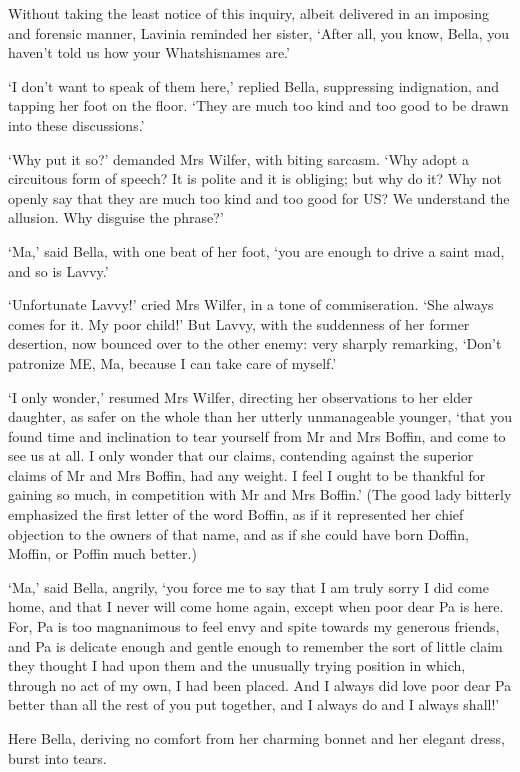 Without taking the least notice of this inquiry, albeit delivered in an
imposing and forensic manner, Lavinia reminded her sister, ‘After all,
you know, Bella, you haven’t told us how your Whatshisnames are.’

‘I don’t want to speak of them here,’ replied Bella, suppressing
indignation, and tapping her foot on the floor. ‘They are much too kind
and too good to be drawn into these discussions.’

‘Why put it so?’ demanded Mrs Wilfer, with biting sarcasm. ‘Why adopt a
circuitous form of speech? It is polite and it is obliging; but why do
it? Why not openly say that they are much too kind and too good for US?
We understand the allusion. Why disguise the phrase?’

‘Ma,’ said Bella, with one beat of her foot, ‘you are enough to drive a
saint mad, and so is Lavvy.’

‘Unfortunate Lavvy!’ cried Mrs Wilfer, in a tone of commiseration. ‘She
always comes for it. My poor child!’ But Lavvy, with the suddenness of
her former desertion, now bounced over to the other enemy: very sharply
remarking, ‘Don’t patronize ME, Ma, because I can take care of myself.’

‘I only wonder,’ resumed Mrs Wilfer, directing her observations to her
elder daughter, as safer on the whole than her utterly unmanageable
younger, ‘that you found time and inclination to tear yourself from
Mr and Mrs Boffin, and come to see us at all. I only wonder that our
claims, contending against the superior claims of Mr and Mrs Boffin,
had any weight. I feel I ought to be thankful for gaining so much, in
competition with Mr and Mrs Boffin.’ (The good lady bitterly emphasized
the first letter of the word Boffin, as if it represented her chief
objection to the owners of that name, and as if she could have born
Doffin, Moffin, or Poffin much better.)

‘Ma,’ said Bella, angrily, ‘you force me to say that I am truly sorry I
did come home, and that I never will come home again, except when poor
dear Pa is here. For, Pa is too magnanimous to feel envy and spite
towards my generous friends, and Pa is delicate enough and gentle enough
to remember the sort of little claim they thought I had upon them and
the unusually trying position in which, through no act of my own, I had
been placed. And I always did love poor dear Pa better than all the rest
of you put together, and I always do and I always shall!’

Here Bella, deriving no comfort from her charming bonnet and her elegant
dress, burst into tears.

